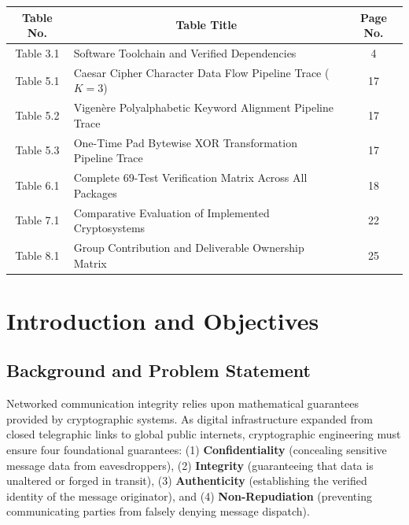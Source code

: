 \documentclass[12pt,a4paper]{report}
\renewcommand{\headrulewidth}{1.8pt}
\renewcommand{\footrulewidth}{1.8pt}
\renewcommand{\headrulewidth}{0pt}
\renewcommand{\footrulewidth}{0pt}
\renewcommand{\headrulewidth}{1.8pt}
\renewcommand{\footrulewidth}{1.8pt}
\begin{document}
\begin{table}[h!]
\centering
\fontsize{9.5}{12}\selectfont
\begin{tabular}{|c|p{4.8in}|c|}
\hline
\rowcolor{tableheader}
\textbf{Table No.} & \multicolumn{1}{c|}{\textbf{Table Title}} & \textbf{Page No.} \\
\hline
Table 3.1 & Software Toolchain and Verified Dependencies & 4 \\
\hline
Table 5.1 & Caesar Cipher Character Data Flow Pipeline Trace ($K = 3$) & 17 \\
\hline
Table 5.2 & Vigen\`ere Polyalphabetic Keyword Alignment Pipeline Trace & 17 \\
\hline
Table 5.3 & One-Time Pad Bytewise XOR Transformation Pipeline Trace & 17 \\
\hline
Table 6.1 & Complete 69-Test Verification Matrix Across All Packages & 18 \\
\hline
Table 7.1 & Comparative Evaluation of Implemented Cryptosystems & 22 \\
\hline
Table 8.1 & Group Contribution and Deliverable Ownership Matrix & 25 \\
\hline
\end{tabular}
\end{table}



\newpage

\setcounter{page}{1}
\pagestyle{fancy}
\renewcommand{\headrulewidth}{1.8pt}
\renewcommand{\footrulewidth}{1.8pt}

\chapter{Introduction and Objectives}

\section{Background and Problem Statement}
Networked communication integrity relies upon mathematical guarantees provided by cryptographic systems. As digital infrastructure expanded from closed telegraphic links to global public internets, cryptographic engineering must ensure four foundational guarantees: (1) \textbf{Confidentiality} (concealing sensitive message data from eavesdroppers), (2) \textbf{Integrity} (guaranteeing that data is unaltered or forged in transit), (3) \textbf{Authenticity} (establishing the verified identity of the message originator), and (4) \textbf{Non-Repudiation} (preventing communicating parties from falsely denying message dispatch).
\end{document}
